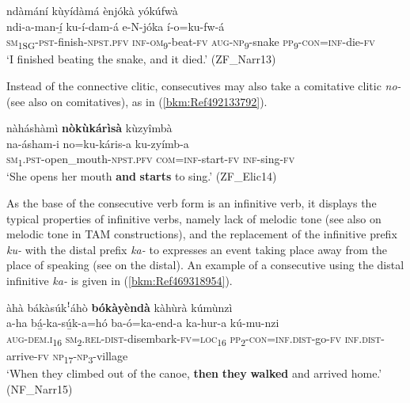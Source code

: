 \ea
\label{bkm:Ref469317924}
ndàmání kùyídàmá ènjókà yókúfwà\\
\gll ndi-a-man-í̲      ku-í-dam-á    e-N-jóka                                                                                                                                              í-o=ku-fw-á \\
\textsc{sm}\textsubscript{1SG}-\textsc{pst}-finish-\textsc{npst}.\textsc{pfv}  \textsc{inf}-\textsc{om}\textsubscript{9}-beat-\textsc{fv}  \textsc{aug}-\textsc{np}\textsubscript{9}-snake \textsc{pp}\textsubscript{9}-\textsc{con}=\textsc{inf}-die-\textsc{fv}\\
\glt ‘I finished beating the snake, and it died.’ (ZF\_Narr13)
\z

Instead of the connective clitic, consecutives may also take a comitative clitic \textit{no-} (see also  on comitatives), as in (\ref{bkm:Ref492133792}).

\ea
\label{bkm:Ref492133792}
nàháshàmì \textbf{nòkùkárìsà} kùzyîmbà\\
\gll na-ásham-i        no=ku-káris-a  ku-zyímb-a\\
\textsc{sm}\textsubscript{1}.\textsc{pst}-open\_mouth-\textsc{npst}.\textsc{pfv}  \textsc{com}=\textsc{inf}-start-\textsc{fv}  \textsc{inf}-sing-\textsc{fv}\\
\glt ‘She opens her mouth \textbf{and} \textbf{starts} to sing.’ (ZF\_Elic14)
\z

As the base of the consecutive verb form is an infinitive verb, it displays the typical properties of infinitive verbs, namely lack of melodic tone (see also  on melodic tone in TAM constructions), and the replacement of the infinitive prefix \textit{ku-} with the distal prefix \textit{ka-} to expresses an event taking place away from the place of speaking (see  on the distal). An example of a consecutive using the distal infinitive \textit{ka-} is given in (\ref{bkm:Ref469318954}).

\newpage
\ea
\label{bkm:Ref469318954}
àhà bákàsúkꜝáhò \textbf{bókàyèndà} kàhùrà kúmùnzì\\
\gll a-ha    bá̲-ka-sú̲k-a=hó ba-ó=ka-end-a    ka-hur-a    kú-mu-nzi\\
\textsc{aug}-\textsc{dem}.\textsc{i}\textsubscript{16}  \textsc{sm}\textsubscript{2}.\textsc{rel}-\textsc{dist}-disembark-\textsc{fv}=\textsc{loc}\textsubscript{16}
\textsc{pp}\textsubscript{2}-\textsc{con}=\textsc{inf}.\textsc{dist}-go-\textsc{fv}  \textsc{inf}.\textsc{dist}-arrive-\textsc{fv}  \textsc{np}\textsubscript{17}-\textsc{np}\textsubscript{3}-village\\
\glt ‘When they climbed out of the canoe, \textbf{then} \textbf{they} \textbf{walked} and arrived home.’ (NF\_Narr15)
\z

